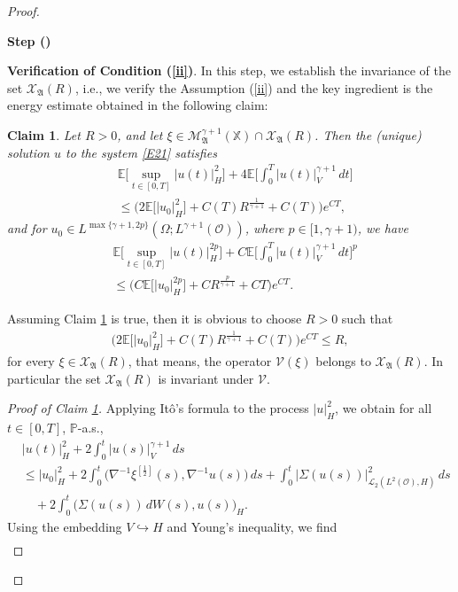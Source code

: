 \documentclass[english,a4paper,11pt]{amsart}
\theoremstyle{plain}
\newtheorem{claim}[theorem]{Claim}
\theoremstyle{definition}
\theoremstyle{remark}
\numberwithin{equation}{section}
\newcounter{lil1}
\newenvironment{step}
{\begin{list} { \bf Step (\Roman{lil1})}
		{ \usecounter{lil1}
			\setlength{\leftmargin}{0.0cm}
			\setlength{\topsep}{0.2cm}
			\setlength{\itemsep}{0.0cm}
			\setlength{\parsep}{0.1cm}
			\setlength{\itemindent}{0.8cm}
			\setlength{\parskip}{0.0cm}}}
	{\end{list}}
\newcounter{lil33}
\newcounter{lil1q}
\newcommand{\MA}{\mathfrak{A}}
\newcommand{\CO}{{{ \mathcal O }}}
\newcommand{\EE}{ \mathbb{E} }
\newcommand{\Mcal} {{\mathcal M}}
\newcommand{\Vcal} {{\mathcal V}}
\newcommand{\Xcal} {{\mathcal X}}
\newcommand{\Afrak} {{\mathfrak A}}
\renewcommand{\P}{\mathbb{P}}
\newcommand{\X}{\mathbb{X}}
\begin{document}
\begin{proof}
\begin{step}
\item \textbf{Verification of Condition (\ref{ii})}.
In this step, we establish the invariance of the set $\mathcal{X}_\MA(R)$, i.e., we verify the Assumption (\ref{ii}) and the key ingredient is the energy estimate obtained in the following claim:
\begin{claim}\label{TCl2} Let $R>0$, and let $\xi\in \Mcal_{\Afrak}^{\gamma+1}(\X)\cap \mathcal{X}_\MA(R)$. Then the (unique) solution $u$ to the system \eqref{E21} satisfies 
\begin{align}\label{EEs}\nonumber
&	\EE\bigg[\sup_{t\in[0,T]}	 | u(t) | _{H}^2\bigg] +4\EE\bigg[\int_0^T | u(t) | _V^{\gamma+1}\,dt\bigg] \\& \leq \Big(2\EE\big[	 | u_0 | _{H}^2\big]+C(T)R^\frac{1}{\gamma+1}+C(T)\Big)e^{CT},
\end{align} and for $u_0\in L^{\max\{\gamma+1,2p\}}(\Omega;L^{\gamma+1}(\mathcal{O}))$, where $p\in [1,\gamma+1)$, we have
	\begin{align*}
		&	\EE\bigg[\sup_{t\in[0,T]}	 | u(t) | _{H}^{2p}\bigg] +C\EE\bigg[\int_0^T | u(t) | _V^{\gamma+1}\,dt\bigg]^p \\& \leq \Big(C\EE\big[	 | u_0 | _{H}^{2p}\big]+CR^\frac{p}{\gamma+1}+CT\Big)e^{CT}. 
\end{align*}
\end{claim}
Assuming Claim \ref{TCl2} is true, then it is obvious to choose $R>0$ such that 
\begin{align*}
	\Big(2\EE\Big[	 | u_0 | _{H}^2\Big]+C(T)R^\frac{1}{\gamma+1}+C(T)\Big)e^{CT}\leq R,
\end{align*}for every $\xi\in \mathcal{X}_\MA(R)$, that means, the operator $\Vcal(\xi)$ belongs to $\Xcal_\Afrak(R)$. In particular the set $\mathcal{X}_\MA(R)$ is invariant under $\mathcal{V}$.
\begin{proof}[Proof of Claim \ref{TCl2}]
Applying It\^o's formula to the process $ | u | _{H}^2$, we obtain for all $t\in[0,T]$, $\P$-a.s., 
\begin{align*}
&	 | u(t) | _{H}^2 +2 \int_0^t | u(s) | _V^{\gamma+1}\,ds 
	\\&\leq 	 | u_0 | _{H}^2+2\int_0^t \big(\nabla^{-1}\xi^{[\frac{1}{2}]}(s), \nabla^{-1}u(s)\big)\,ds+  \int_0^t | \Sigma(u(s)) | _{\mathcal{L}_2(L^2(\CO),H)}^2\,ds \\&\quad + 2\int_0^t \big(\Sigma(u(s))\, dW(s),u(s)\big)_H.
\end{align*}Using the embedding $V\hookrightarrow H$ and Young's inequality, we find 
\begin{align*}

\end{align*}
\end{proof}
\end{step}
\end{proof}
\end{document}
